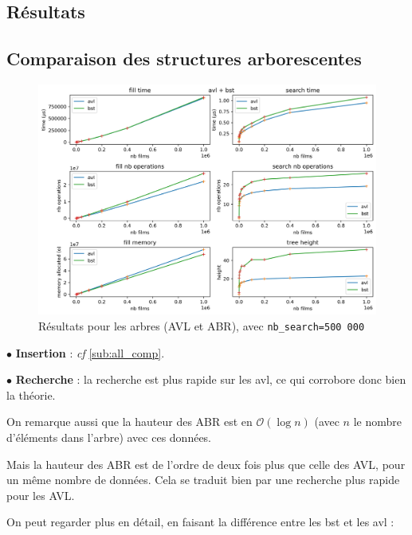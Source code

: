 \documentclass[a4paper, 12pt, twoside]{article}
\begin{document}
\begin{indt}{\section{Résultats}}
        \begin{indt}{\subsection{Comparaison des structures arborescentes}} %
            \label{sub:tree_comp}

            \begin{figure}[H]
                \centering
            
                \includegraphics[width=1.0\textwidth]{../plots/nb_search_500_000/bst_avl.png}
            
                \caption{Résultats pour les arbres (AVL et ABR), avec \texttt{nb\_search=500 000}}
                \label{fig:avl_bst}
            \end{figure}

            $\bullet$ \textbf{Insertion} : \textit{cf} \ref{sub:all_comp}.

            $\bullet$ \textbf{Recherche} : la recherche est plus rapide sur les avl, ce qui corrobore donc bien la théorie.

            On remarque aussi que la hauteur des ABR est en $\mathcal O(\log n)$ (avec $n$ le nombre d'éléments dans l'arbre) avec ces données.

            Mais la hauteur des ABR est de l'ordre de deux fois plus que celle des AVL, pour un même nombre de données.
            Cela se traduit bien par une recherche plus rapide pour les AVL.

            \vspace{12pt}
            
            On peut regarder plus en détail, en faisant la différence entre les bst et les avl :
            \begin{figure}[H]
                \centering
            

\end{figure}
\end{indt}
\end{indt}
\end{document}
